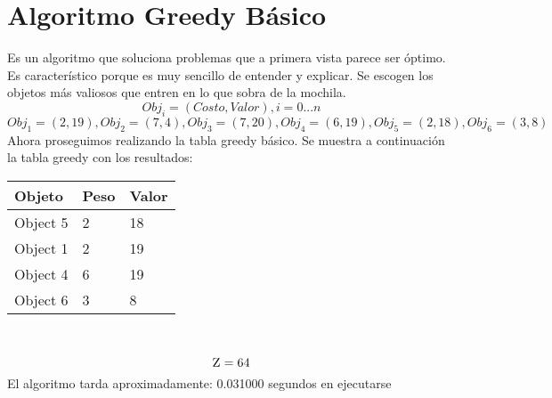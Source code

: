 \documentclass[10pt,letterpaper]{article}
\begin{document}
\section{Algoritmo Greedy Básico} 
        Es un algoritmo que soluciona problemas que a primera vista parece ser 
        óptimo. Es característico porque es muy sencillo de entender y explicar. 
        Se escogen los objetos más valiosos que entren en lo que sobra de la mochila. 
        \[ Obj_{i} = (Costo, Valor), i = 0...n \]
\[ Obj_{1} = (2, 19), Obj_{2} = (7, 4), Obj_{3} = (7, 20), Obj_{4} = (6, 19), Obj_{5} = (2, 18), Obj_{6} = (3, 8) \]
\newline Ahora proseguimos realizando la tabla greedy básico.
Se muestra a continuación la tabla greedy con los resultados: 
\begin{center}
\begin{tabu} to 0.6\textwidth { | X[l] | X[l] | X[l] | } 
\hline
{}
\textbf{Objeto} & \textbf{Peso} & \textbf{Valor}\\
\hline
Object 5 & 2 & 18 \\
\hline
Object 1 & 2 & 19 \\
\hline
Object 4 & 6 & 19 \\
\hline
Object 6 & 3 & 8 \\
\hline
\end{tabu} \\
\end{center}
\[ \textsc{\normalsize Z}\\[0.5cm] = 64 \] 
\newline El algoritmo tarda aproximadamente: 0.031000 segundos en ejecutarse
\end{document}
